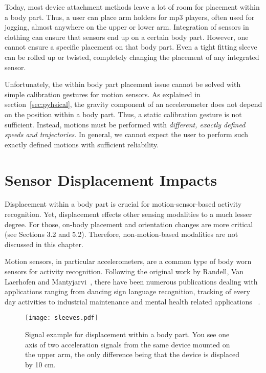 Today, most device attachment methods leave a lot of room for placement within a body part. Thus, a user can place arm holders for mp3 players, often used for jogging, almost anywhere on the upper or lower arm. 
Integration of sensors in clothing can ensure that sensors end up on a certain body part. However, one cannot ensure a specific placement on that body part. Even a tight fitting sleeve can be rolled up or twisted, completely changing the placement of any integrated sensor.

Unfortunately, the within body part placement issue cannot be solved with simple calibration gestures for motion sensors. As explained in section~\ref{sec:pyhsical}, the gravity component of an accelerometer does not depend on the position within a body part. Thus, a static calibration gesture is not sufficient. Instead, motions must be performed with {\em different, exactly defined speeds and trajectories}. In general, we cannot expect the user to perform such exactly defined motions with sufficient reliability. 

\section{Sensor Displacement Impacts}
\label{dis:impacts}
Displacement within a body part is crucial for motion-sensor-based
activity recognition. Yet, displacement effects other sensing modalities to a much lesser degree. For those, on-body placement and orientation changes are more critical (see Sections 3.2 and 5.2). Therefore, non-motion-based modalities are not discussed in this chapter.

Motion sensors, in particular accelerometers, are a common type of
body worn sensors for activity recognition. Following the original
work by Randell, Van Laerhofen and
Mantyjarvi~\cite{randell2000caa,vanlaerhoven2000swt,mantyjarvi2001rhm},
there have been numerous publications dealing with applications
ranging from dancing sign language recognition, tracking of every day
activities to industrial maintenance and mental health related
applications
~\cite{aylward2006swc,brashear2003ums,vanLaerhoven:2007p1441,
Krause:2006p1527,prevasiveskoda,westeyn2005rma}.


\begin{figure*}[t]
\centering   
\texttt{[image: sleeves.pdf]}
\caption[Displacement accelerometer signal example]{Signal example for displacement within a body part. You see one axis of
two acceleration signals from the same device mounted on the upper arm, the
only difference being that the device is displaced by 10 cm.}
\label{fig:Dexample}
\end{figure*}


